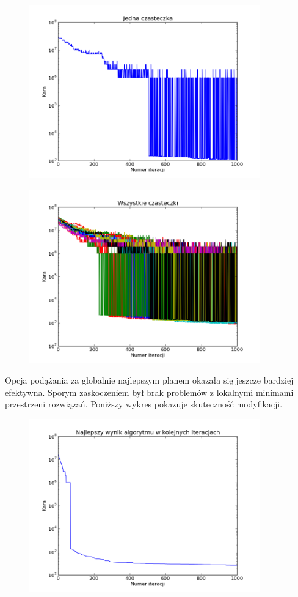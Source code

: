 \begin{figure}[H]
\includegraphics[width=10cm]{img/localbest_particle.png}
\centering
\end{figure}
\begin{figure}[H]
\includegraphics[width=10cm]{img/localbest_particle_all.png}
\centering
\end{figure}
\par Opcja podążania za globalnie najlepszym planem okazała się jeszcze bardziej efektywna. Sporym zaskoczeniem był brak problemów z lokalnymi minimami przestrzeni rozwiązań. Poniższy wykres pokazuje skuteczność modyfikacji.
\begin{figure}[H]
\includegraphics[width=10cm]{img/globalbest_penalty.png}
\centering
\end{figure}
